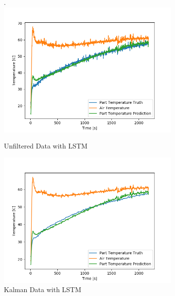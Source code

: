 \begin{figure}[ht]
    \vspace{-0.9cm}
    \begin{subfigure}{.34\linewidth}.
        \centering
    	\includegraphics[width=1.1\linewidth]{filter/unfiltered_LSTM.png}
        \caption{Unfiltered Data with LSTM}
    \end{subfigure}
    \begin{subfigure}{.34\linewidth}
    	\centering
    	\includegraphics[width=1.1\linewidth]{filter/kalman_LSTM.png}
        \caption{Kalman Data with LSTM}
    \end{subfigure}
    \begin{subfigure}{.34\linewidth}
    	\centering

\end{subfigure}
\end{figure}
